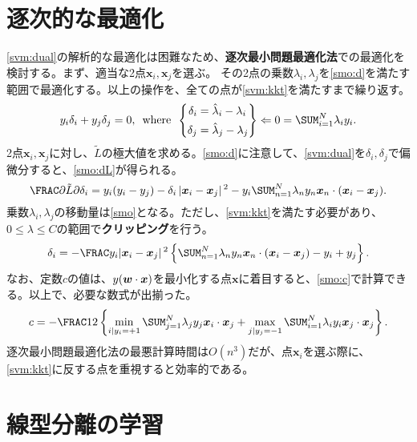 \documentclass[10pt,a4paper]{book}
\begin{document}
\section{逐次的な最適化\label{sect:smo}}

\eqref{svm:dual}の解析的な最適化は困難なため、\textbf{逐次最小問題最適化法}での最適化を検討する。まず、適当な2点$\bm{x}_i,\bm{x}_j$を選ぶ。
その2点の乗数$\lambda_i,\lambda_j$を\eqref{smo:d}を満たす範囲で最適化する。以上の操作を、全ての点が\eqref{svm:kkt}を満たすまで繰り返す。
%
\begin{equation}
\label{eq:smo:d}
y_i \delta_i + y_j \delta_j = 0,
\where
\left\{
\begin{aligned}
\delta_i &= \hat{\lambda}_i - \lambda_i \\
\delta_j &= \hat{\lambda}_j - \lambda_j
\end{aligned}
\right\}
\Leftarrow 0 = \sum_{i=1}^N \lambda_i y_i.
\end{equation}
%
2点$\bm{x}_i,\bm{x}_j$に対し、$\tilde{L}$の極大値を求める。\eqref{smo:d}に注意して、\eqref{svm:dual}を$\delta_i,\delta_j$で偏微分すると、\eqref{smo:dL}が得られる。
%
\begin{equation}
\label{eq:smo:dL}
\pdiff{\tilde{L}}{\delta_i} = y_i (y_i-y_j)-\delta_i \abs{\bm{x}_i-\bm{x}_j}^2-y_i \sum_{n=1}^N \lambda_n y_n \dprod{\bm{x}_n}{(\bm{x}_i-\bm{x}_j)}.
\end{equation}
%
乗数$\lambda_i,\lambda_j$の移動量は\eqref{smo}となる。ただし、\eqref{svm:kkt}を満たす必要があり、$0\leq\lambda\leq C$の範囲で\textbf{クリッピング}を行う。
%
\begin{equation}
\label{eq:smo}
\delta_i = -\frac{y_i}{\abs{\bm{x}_i-\bm{x}_j}^2} \seq{\sum_{n=1}^N \lambda_n y_n \dprod{\bm{x}_n}{(\bm{x}_i-\bm{x}_j)}-y_i+y_j}.
\end{equation}
%
なお、定数$c$の値は、$y(\bm{w} \cdot \bm{x})$を最小化する点$\bm{x}$に着目すると、\eqref{smo:c}で計算できる。以上で、必要な数式が出揃った。
%
\begin{equation}
\label{eq:smo:c}
c = -\frac{1}{2} \seq{
\min_{i|y_i=+1} \sum_{j=1}^N \lambda_j y_j \dprod{\bm{x}_i}{\bm{x}_j} +
\max_{j|y_j=-1} \sum_{i=1}^N \lambda_i y_i \dprod{\bm{x}_j}{\bm{x}_j}}.
\end{equation}
%
逐次最小問題最適化法の最悪計算時間は$O(n^3)$だが、点$\bm{x}_i$を選ぶ際に、\eqref{svm:kkt}に反する点を重視すると効率的である。

\section{線型分離の学習}
\end{document}
